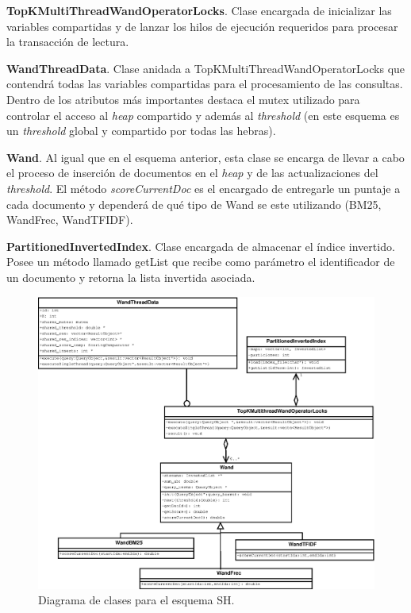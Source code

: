 \begin{list}{}{}
	\item \textbf{TopKMultiThreadWandOperatorLocks}. Clase encargada de inicializar las variables compartidas y de lanzar los hilos de ejecución requeridos para procesar la transacción de lectura.
	
	\item \textbf{WandThreadData}. Clase anidada a TopKMultiThreadWandOperatorLocks que contendrá todas las variables compartidas para el procesamiento de las consultas. Dentro de los atributos más importantes destaca el mutex utilizado para controlar el acceso al \textit{heap} compartido y además al \textit{threshold} (en este esquema es un \textit{threshold} global y compartido por todas las hebras).
	
	\item \textbf{Wand}. Al igual que en el esquema anterior, esta clase se encarga de llevar a cabo el proceso de inserción de documentos en el \textit{heap} y de las actualizaciones del \textit{threshold}. El método \textit{scoreCurrentDoc} es el encargado de entregarle un puntaje a cada documento y dependerá de qué tipo de Wand se este utilizando (BM25, WandFrec, WandTFIDF). 

	\item \textbf{PartitionedInvertedIndex}. Clase encargada de almacenar el índice invertido. Posee un método llamado getList que recibe como parámetro el identificador de un documento y retorna la lista invertida asociada. 

\end{list}

\begin{figure}[tp]
\centering
\includegraphics[scale=.75]{images/TopKMultiThreadWandOperatorLocks.eps}
\caption{Diagrama de clases para el esquema SH.}
\label{fig:TopKMultiThreadWandOperatorLocks}
\end{figure}

